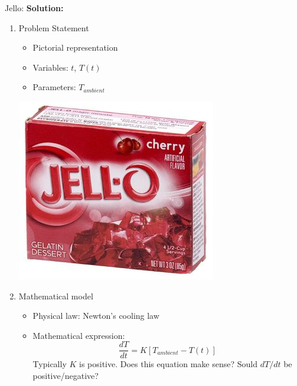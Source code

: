 \begin{exmp}{Jello:}
\textbf{Solution:}\\
\begin{enumerate}
\item {Problem Statement}\\
\begin{minipage}{0.6 \textwidth}
\begin{itemize}
\item Pictorial representation
\item Variables: $t$, $T(t)$
\item Parameters: $T_{ambient}$
\end{itemize}
\end{minipage}
\begin{minipage}{0.25 \textwidth}
\includegraphics[width=\textwidth]{figs/jello.jpg} 
\end{minipage}
\item {Mathematical model}\\
\begin{itemize}
\item Physical law: Newton's cooling law
\item Mathematical expression: 
\begin{equation*}
\frac{dT}{dt}=K\left[T_{ambient}-T(t)\right]
\end{equation*}
Typically $K$ is positive. Does this equation make sense? Sould $dT/dt$ be positive/negative?\\


\end{itemize}
\end{enumerate}
\end{exmp}
